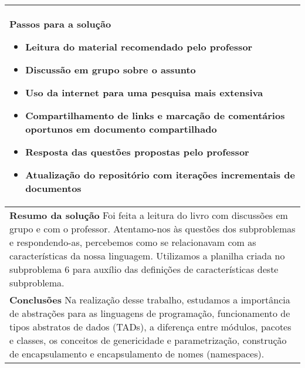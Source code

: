 \documentclass[12pt, a4paper]{article}
\begin{document}
\begin{longtabu}{| X |}
    \textbf{Passos para a solução} \newline
    \begin{minipage}[t]{\linewidth}
    \begin{itemize}[itemsep=.5ex,parsep=.0ex,after=\strut,leftmargin=15pt]
        \item
        Leitura do material recomendado pelo professor
        \item
        Discussão em grupo sobre o assunto
        \item
        Uso da internet para uma pesquisa mais extensiva
        \item
        Compartilhamento de links e marcação de comentários oportunos em
        documento compartilhado
        \item
        Resposta das questões propostas pelo professor
        \item
        Atualização do repositório com iterações incrementais de documentos
    \end{itemize}
    \end{minipage}
    \\ \hline

    \textbf{Resumo da solução} \newline
    Foi feita a leitura do livro com discussões em grupo e com o professor.
    Atentamo-nos às questões dos subproblemas e respondendo-as, percebemos como
    se relacionavam com as características da nossa linguagem. Utilizamos a
    planilha criada no subproblema 6 para auxílio das definições de
    características deste subproblema.
    \\ \hline

    \textbf{Conclusões} \newline
    Na realização desse trabalho, estudamos a importância de abstrações para as
    linguagens de programação, funcionamento de tipos abstratos de dados (TADs), a diferença entre módulos, pacotes e classes, os conceitos de genericidade e parametrização, construção de encapsulamento e encapsulamento de
    nomes (namespaces).
    \\ \hline

\end{longtabu}
\end{document}
